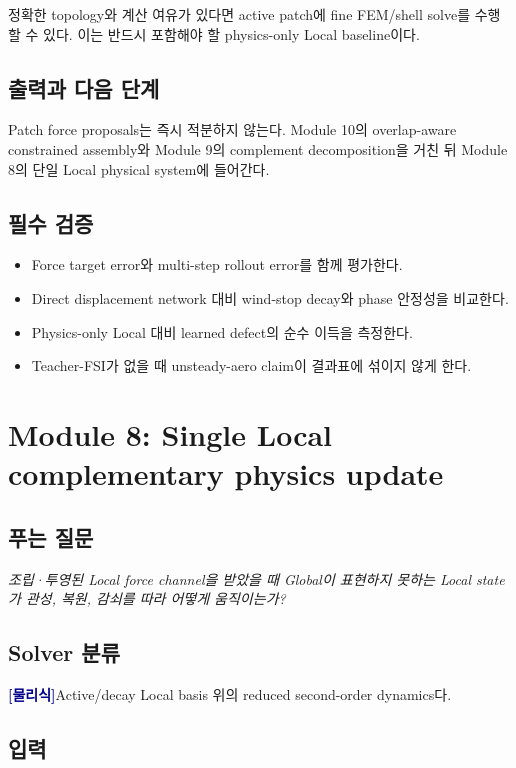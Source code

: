 \documentclass[11pt,a4paper]{article}
\newcommand{\physics}{\textcolor{darkblue}{\textbf{[물리식]}}}
\begin{document}
정확한 topology와 계산 여유가 있다면 active patch에 fine FEM/shell solve를 수행할 수 있다.
이는 반드시 포함해야 할 physics-only Local baseline이다.

\subsection*{출력과 다음 단계}

Patch force proposals는 즉시 적분하지 않는다.
Module 10의 overlap-aware constrained assembly와 Module 9의 complement decomposition을 거친 뒤
Module 8의 단일 Local physical system에 들어간다.

\subsection*{필수 검증}

\begin{itemize}[leftmargin=1.5em]
  \item Force target error와 multi-step rollout error를 함께 평가한다.
  \item Direct displacement network 대비 wind-stop decay와 phase 안정성을 비교한다.
  \item Physics-only Local 대비 learned defect의 순수 이득을 측정한다.
  \item Teacher-FSI가 없을 때 unsteady-aero claim이 결과표에 섞이지 않게 한다.
\end{itemize}

\section{Module 8: Single Local complementary physics update}

\subsection*{푸는 질문}

\emph{조립·투영된 Local force channel을 받았을 때 Global이 표현하지 못하는 Local state가
관성, 복원, 감쇠를 따라 어떻게 움직이는가?}

\subsection*{Solver 분류}

\physics Active/decay Local basis 위의 reduced second-order dynamics다.

\subsection*{입력}
\end{document}
